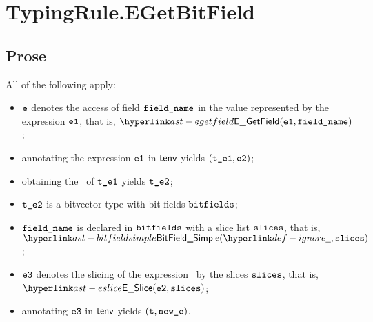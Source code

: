 
\section{TypingRule.EGetBitField \label{sec:TypingRule.EGetBitField}}

\subsection{Prose}
All of the following apply:
\begin{itemize}
  \item $\texttt{e}$ denotes the access of field $\texttt{field\_name}$ in the value represented by the expression $\texttt{e1}$, that is, $\EGetField(\veone, \fieldname)$;
  \item annotating the expression $\texttt{e1}$ in $\textsf{tenv}$ yields $(\texttt{t\_e1}, \texttt{e2})$\ProseOrTypeError;
  \item obtaining the \underlyingtype\ of $\texttt{t\_e1}$ yields $\texttt{t\_e2}$\ProseOrTypeError;
  \item $\texttt{t\_e2}$ is a bitvector type with bit fields $\texttt{bitfields}$;
  \item $\texttt{field\_name}$ is declared in $\texttt{bitfields}$ with a slice list $\texttt{slices}$, that is, \\ $\BitFieldSimple(\Ignore, \slices)$;
  \item $\texttt{e3}$ denotes the slicing of the expression \vetwo\ by the slices $\texttt{slices}$, that is, \\ $\ESlice(\vetwo, \slices)$;
  \item annotating $\texttt{e3}$ in $\textsf{tenv}$ yields $(\texttt{t}, \texttt{new\_e})$\ProseOrTypeError.
\end{itemize}



